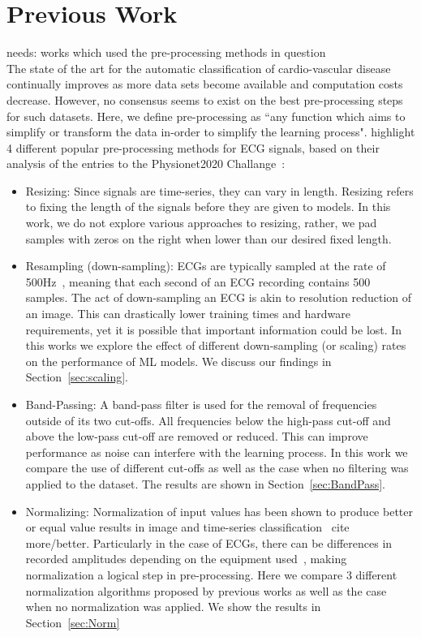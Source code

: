 \documentclass[pmlr,twocolumn]{jmlr}%
\begin{document}
\section{Previous Work}
{\color{red} needs: works which used the pre-processing methods in question}\\
\label{sec:prevwork}
The state of the art for the automatic classification of cardio-vascular disease continually improves as more data sets become available and computation costs decrease. However, no consensus seems to exist on the best pre-processing steps for such datasets. Here, we define pre-processing as ``any function which aims to simplify or transform the data in-order to simplify the learning process". \cite{hong2022practical} highlight 4 different popular pre-processing methods for ECG signals, based on their analysis of the entries to the Physionet2020 Challange~\cite{goldberger2000physiobank,alday2020classification}:
\begin{itemize}
    \item Resizing: Since signals are time-series, they can vary in length. Resizing refers to fixing the length of the signals before they are given to models. In this work, we do not explore various approaches to resizing, rather, we pad samples with zeros on the right when lower than our desired fixed length. 
    \item Resampling (down-sampling): ECGs are typically sampled at the rate of 500Hz~\cite{luo2010review,uwaechia2021comprehensive}, meaning that each second of an ECG recording contains 500 samples. The act of down-sampling an ECG is akin to resolution reduction of an image. This can drastically lower training times and hardware requirements, yet it is possible that important information could be lost. In this works we explore the effect of different down-sampling (or scaling) rates on the performance of ML models. We discuss our findings in Section~\ref{sec:scaling}. 
    \item Band-Passing: A band-pass filter is used for the removal of frequencies outside of its two cut-offs. All frequencies below the high-pass cut-off and above the low-pass cut-off are removed or reduced. This can improve performance as noise can interfere with the learning process. In this work we compare the use of different cut-offs as well as the case when no filtering was applied to the dataset. The results are shown in Section~\ref{sec:BandPass}.
    \item Normalizing: Normalization of input values has been shown to produce better or equal value results in image and time-series classification~\cite{bhanja2018impact}{\color{red} cite more/better}. Particularly in the case of ECGs, there can be differences in recorded amplitudes depending on the equipment used~\cite{uwaechia2021comprehensive}, making normalization a logical step in pre-processing. Here we compare 3 different normalization algorithms proposed by previous works as well as the case when no normalization was applied. We show the results in Section~\ref{sec:Norm}
\end{itemize}
\end{document}
